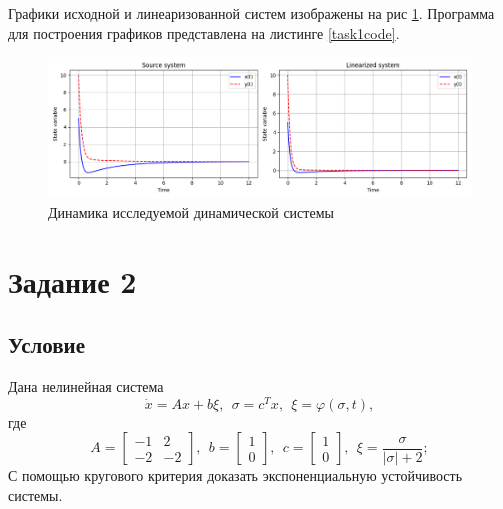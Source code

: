 \documentclass[a4paper, 12pt]{article}
\begin{document}
    Графики исходной и линеаризованной систем изображены на рис \ref{fig:task1}. Программа для построения графиков представлена на листинге \ref{task1code}.
    \begin{figure}[H]
        \centering
        \includegraphics[scale=0.55]{task1.png}
        \captionsetup{skip=0pt}
        \caption{Динамика исследуемой динамической системы}
        \label{fig:task1}
    \end{figure}


    \section{Задание 2}
    \subsection{Условие}
    Дана нелинейная система
    $$
    \dot{x}=Ax+b\xi,\ \ \sigma=c^Tx,\ \ \xi=\varphi(\sigma,t),
    $$
    где
    $$
    A=
    \begin{bmatrix}
        -1 & 2\\
        -2 & -2
    \end{bmatrix},\ \
    b=
    \begin{bmatrix}
        1\\
        0
    \end{bmatrix},\ \
    c=
    \begin{bmatrix}
        1\\
        0
    \end{bmatrix},\ \
    \xi=
    \dfrac{\sigma}{|\sigma|+2};
    $$
    С помощью кругового критерия доказать экспоненциальную устойчивость системы.
\end{document}
